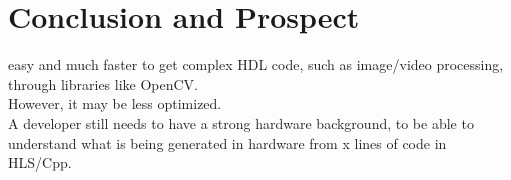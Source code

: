 \chapter{Conclusion and Prospect}
\label{cha:ConclusionAndProspect}



%
%
%
%


easy and much faster to get complex HDL code, such as image/video processing, through libraries like OpenCV.\\
However, it may be less optimized.\\
A developer still needs to have a strong hardware background, to be able to understand what is being generated in hardware from x lines of code in HLS/Cpp.
